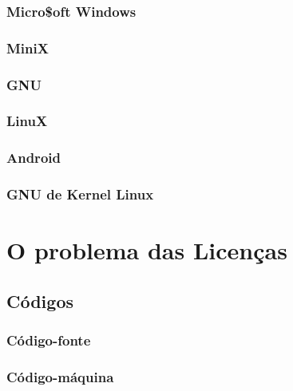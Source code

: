 \subsection[Micro\$oft Windows]{Micro\$oft Windows}


\subsection[MiniX]{MiniX}


\subsection[GNU]{GNU}


\subsection[LinuX]{LinuX}


\subsection[Android]{Android}


\subsection[GNU de Kernel Linux]{GNU de Kernel Linux}


\chapter[O problema das Licenças]{O problema das Licenças}

\section[Códigos]{Códigos}

\subsection[Código-fonte]{Código-fonte}


\subsection[Código-máquina]{Código-máquina}


